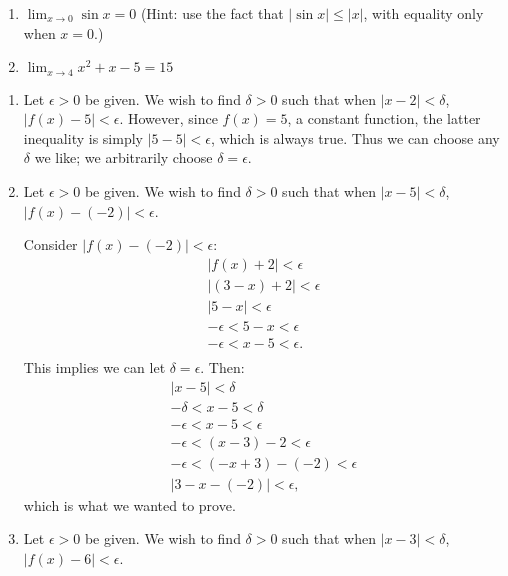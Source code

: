 \begin{enumialphparenastyle}
\begin{ex}
\begin{enumerate}
\item {$\displaystyle \lim_{x\to 0} \sin x= 0$ (Hint: use the fact that $|\sin x| \leq |x|$, with equality only when $x=0$.)}
\item {$\displaystyle \lim_{x\to 4} x^2+x-5 = 15$}

\end{enumerate}

\begin{sol}
\begin{enumerate}
\item {Let $\epsilon >0$ be given. We wish to find $\delta >0$ such that when $|x-2|<\delta$, $|f(x)-5|<\epsilon$. However, since $f(x)=5$, a constant function, the latter inequality is simply $|5-5|<\epsilon$, which is always true. Thus we can choose any $\delta$ we like; we arbitrarily choose $\delta =\epsilon$. 
}
\item {Let $\epsilon >0$ be given. We wish to find $\delta >0$ such that when $|x-5|<\delta$, $|f(x)-(-2)|<\epsilon$. 

Consider $|f(x)-(-2)|<\epsilon$:
\begin{gather*}
|f(x) + 2 | < \epsilon \\
|(3-x) + 2 |<\epsilon \\
| 5-x | < \epsilon \\
-\epsilon < 5-x < \epsilon \\
-\epsilon < x-5 < \epsilon. \\
\end{gather*}
This implies we can let $\delta =\epsilon$. Then:
\begin{gather*}
|x-5|<\delta \\
-\delta < x-5 < \delta\\
-\epsilon < x-5 < \epsilon\\
-\epsilon < (x-3)-2 < \epsilon \\
-\epsilon < (-x+3)-(-2) < \epsilon \\
|3-x - (-2)| < \epsilon,
\end{gather*}
which is what we wanted to prove.
}

\item {Let $\epsilon >0$ be given. We wish to find $\delta >0$ such that when $|x-3|<\delta$, $|f(x)-6|<\epsilon$. 

}
\end{enumerate}
\end{sol}
\end{ex}
\end{enumialphparenastyle}
